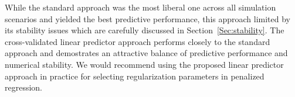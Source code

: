 While the standard approach was the most liberal one across all simulation scenarios and yielded the best predictive performance, this approach limited by its stability issues which are carefully discussed in Section~\ref{Sec:stability}. The cross-validated linear predictor approach performs closely to the standard approach and demostrates an attractive balance of predictive performance and numerical stability.  We would recommend using the proposed linear predictor approach in practice for selecting regularization parameters in penalized regression.







